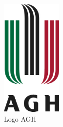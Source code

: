 \begin{figure}[H]
  \centering
    \includegraphics[width=30mm]{ge/agh_logo.jpg}
  \caption{Logo AGH}
  \label{fig:aghlogo}
\end{figure}

\lstset{language=JavaScript}
\begin{lstlisting}[label={lst:logoaghsvg},caption={Logo AGH w zapisie SVG.}]


\end{lstlisting}
